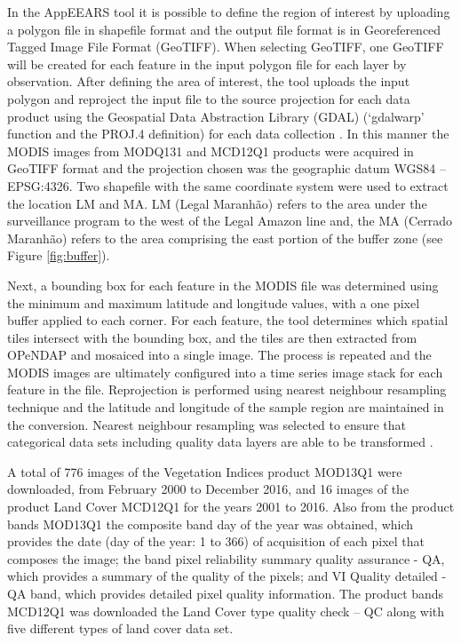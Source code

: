 In the AppEEARS tool it is possible to define the region of interest by uploading a polygon file in shapefile format and the output file format is in Georeferenced Tagged Image File Format (GeoTIFF). When selecting GeoTIFF, one GeoTIFF will be created for each feature in the input polygon file for each layer by observation. After defining the area of interest, the tool uploads the input polygon and reproject the input file to the source projection for each data product using the Geospatial Data Abstraction Library (GDAL) (‘gdalwarp’ function and the PROJ.4 definition) for each data collection \citep{usgs_2018}. In this manner the MODIS images from MODQ131 and MCD12Q1 products were acquired in GeoTIFF format and the projection chosen was the geographic datum WGS84 – EPSG:4326. Two shapefile with the same coordinate system were used to extract the location LM and MA. LM (Legal Maranhão) refers to the area under the surveillance program to the west of the Legal Amazon line and, the MA (Cerrado Maranhão) refers to the area comprising the east portion of the buffer zone (see Figure \ref{fig:buffer}).

Next, a bounding box for each feature in the MODIS file was determined using the minimum and maximum latitude and longitude values, with a one pixel buffer applied to each corner. For each feature, the tool determines which spatial tiles intersect with the bounding box, and the tiles are then extracted from OPeNDAP \citep{ cornillon_2003} and mosaiced into a single image. The process is repeated and the MODIS images are ultimately configured into a time series image stack for each feature in the file. Reprojection is performed using nearest neighbour resampling technique and the latitude and longitude of the sample region are maintained in the conversion. Nearest neighbour resampling was selected to ensure that categorical data sets including quality data layers are able to be transformed \citep{usgs_2018}. 

A total of 776 images of the Vegetation Indices product MOD13Q1 were downloaded, from February 2000 to December 2016, and 16 images of the product Land Cover MCD12Q1 for the years 2001 to 2016. Also from the product bands MOD13Q1 the composite band day of the year was obtained, which provides the date (day of the year: 1 to 366) of acquisition of each pixel that composes the image; the band pixel reliability summary quality assurance - QA, which provides a summary of the quality of the pixels; and VI Quality detailed - QA band, which provides detailed pixel quality information. The product bands MCD12Q1 was downloaded the Land Cover type quality check – QC along with five different types of land cover data set.

